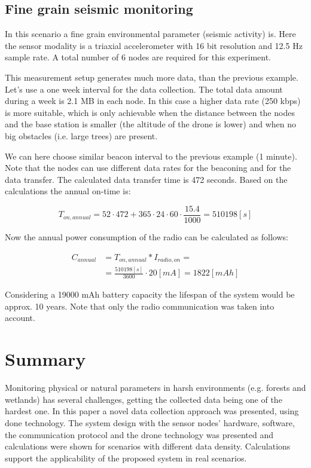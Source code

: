 \documentclass[conference]{IEEEtran}
\begin{document}
\subsection{Fine grain seismic monitoring}

In this scenario a fine grain environmental parameter (seismic activity) is. Here the
sensor modality is a triaxial accelerometer with 16 bit resolution and 12.5 Hz
sample rate. A total number of 6 nodes are required for this experiment.

This measurement setup generates much more data, than the previous example. Let's
use a one week interval for the data collection. The total data amount during
a week is 2.1 MB in each node. In this case a higher data rate (250 kbps) is more
suitable, which is only achievable when the distance between the nodes and the
base station is smaller (the altitude of the drone is lower) and when no big
obstacles (i.e. large trees) are present.

We can here choose similar beacon interval to the previous example (1 minute). Note
that the nodes can use different data rates for the beaconing and for the
data transfer. The calculated data transfer time is 472 seconds. Based on
the calculations the annual on-time is:

\begin{equation}
    T_{on,annual} = 52 \cdot 472 + 365 \cdot 24 \cdot 60 \cdot \frac{15.4}{1000} = 510198 [s]
\end{equation}

Now the annual power consumption of the radio can be calculated as
follows:

\begin{align}
    C_{annual} &= T_{on,annual} * I_{radio,on} = \\
     &= \frac{510198 [s]}{3600} \cdot 20 [mA] = 1822 [mAh]
\end{align}

Considering a 19000 mAh battery capacity the lifespan of the system would
be approx. 10 years. Note that only the radio communication was taken into account.

\section{Summary}

Monitoring physical or natural parameters in harsh environments (e.g. forests and wetlands) has several
challenges, getting the collected data being one of the hardest one. In this paper a novel data
collection approach was presented, using done technology.
The system design with the sensor nodes' hardware, software,
the communication protocol and the drone technology was presented and
calculations were shown for scenarios with different data density.
Calculations support the applicability of the proposed system
in real scenarios.



\end{document}
